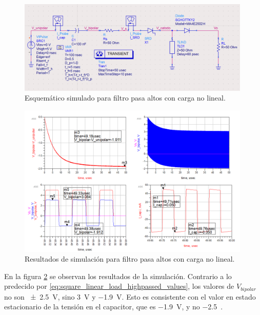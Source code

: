 \begin{figure}[tbp]
    \centering
    \includegraphics[width=0.99\textwidth]{images/highpass_filter_nonlinear_load_sch.png}
    \caption{Esquemático simulado para filtro pasa altos con carga no lineal.}
    \label{fig:highpass_filter_nonlinear_load_sch}
\end{figure}

\begin{figure}[tbp]
    \centering
    \includegraphics[width=0.99\textwidth]{images/highpass_filter_nonlinear_load_sim_result.png}
    \caption{Resultados de simulación para filtro pasa altos con carga no lineal.}
    \label{fig:highpass_filter_nonlinear_load_sim_result}
\end{figure}

En la figura \ref{fig:highpass_filter_nonlinear_load_sim_result} se observan los
resultados de la simulación. Contrario a lo predecido por
\ref{eq:square_linear_load_highpassed_values}, los valores de $V_{bipolar}$ no
son \qty{\pm2.5}{\volt}, sino \qty{3}{\volt} y \qty{-1.9}{\volt}. Esto es
consistente con el valor en estado estacionario de la tensión en el capacitor,
que es \qty{-1.9}{\volt}, y no \qty{-2.5}{\volt.}

